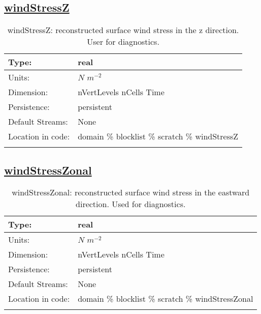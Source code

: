 \subsection[windStressZ]{\hyperref[sec:var_tab_scratch]{windStressZ}}
\label{subsec:var_sec_scratch_windStressZ}
\begin{center}
\begin{longtable}{| p{2.0in} | p{4.0in} |}
        \hline 
        Type: & real \\
        \hline 
        Units: & $N$ $m^{-2}$ \\
        \hline 
        Dimension: & nVertLevels nCells Time \\
        \hline 
        Persistence: & persistent \\
        \hline 
		 Default Streams: & None \\
        \hline 
		 Location in code: & domain \% blocklist \% scratch \% windStressZ \\
		 \hline 
    \caption{windStressZ: reconstructed surface wind stress in the z direction. User for diagnostics.}
\end{longtable}
\end{center}
\subsection[windStressZonal]{\hyperref[sec:var_tab_scratch]{windStressZonal}}
\label{subsec:var_sec_scratch_windStressZonal}
\begin{center}
\begin{longtable}{| p{2.0in} | p{4.0in} |}
        \hline 
        Type: & real \\
        \hline 
        Units: & $N$ $m^{-2}$ \\
        \hline 
        Dimension: & nVertLevels nCells Time \\
        \hline 
        Persistence: & persistent \\
        \hline 
		 Default Streams: & None \\
        \hline 
		 Location in code: & domain \% blocklist \% scratch \% windStressZonal \\
		 \hline 
    \caption{windStressZonal: reconstructed surface wind stress in the eastward direction. Used for diagnostics.}
\end{longtable}
\end{center}
